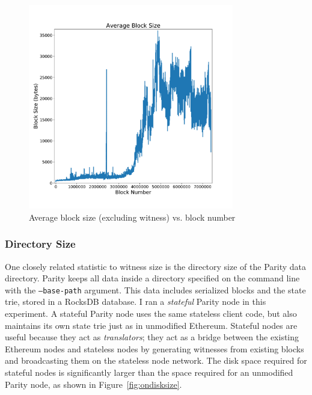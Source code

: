 \documentclass[12pt]{article}
\begin{document}
\begin{figure}[H]
  \centering
  \includegraphics[width=0.8\textwidth]{../figures/results/graphs/background/block-size.pdf}
  \caption{Average block size (excluding witness) vs. block number}
  \label{fig:blocksize}
\end{figure}


\subsubsection{Directory Size}

One closely related statistic to witness size is the directory size of the Parity data directory. Parity keeps all data inside a directory specified on the command line with the \texttt{--base-path} argument. This data includes serialized blocks and the state trie, stored in a RocksDB database. I ran a \emph{stateful} Parity node in this experiment. A stateful Parity node uses the same stateless client code, but also maintains its own state trie just as in unmodified Ethereum. Stateful nodes are useful because they act as \emph{translators}; they act as a bridge between the existing Ethereum nodes and stateless nodes by generating witnesses from existing blocks and broadcasting them on the stateless node network. The disk space required for stateful nodes is significantly larger than the space required for an unmodified Parity node, as shown in Figure~\ref{fig:ondisksize}.
\end{document}
